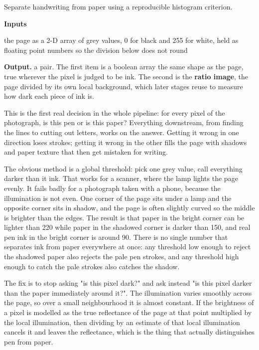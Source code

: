 Separate handwriting from paper using a reproducible histogram criterion.




\noindent\textbf{Inputs}
\begin{description}[leftmargin=2.2em,style=nextline,font=\normalfont\ttfamily]\setlength\itemsep{1pt}
  \item[{gray}] \normalfont the page as a 2-D array of grey values, 0 for black and 255 for white, held as floating point numbers so the division below does not round
\end{description}

\noindent\textbf{Output.} a pair. The first item is a boolean array the same shape as the page, true wherever the pixel is judged to be ink. The second is the \textbf{ratio image}, the page divided by its own local background, which later stages reuse to measure how dark each piece of ink is.


This is the first real decision in the whole pipeline: for every pixel of the photograph, is this pen or is this paper? Everything downstream, from finding the lines to cutting out letters, works on the answer. Getting it wrong in one direction loses strokes; getting it wrong in the other fills the page with shadows and paper texture that then get mistaken for writing.


The obvious method is a global threshold: pick one grey value, call everything darker than it ink. That works for a scanner, where the lamp lights the page evenly. It fails badly for a photograph taken with a phone, because the illumination is not even. One corner of the page sits under a lamp and the opposite corner sits in shadow, and the page is often slightly curved so the middle is brighter than the edges. The result is that paper in the bright corner can be lighter than 220 while paper in the shadowed corner is darker than 150, and real pen ink in the bright corner is around 90. There is no single number that separates ink from paper everywhere at once: any threshold low enough to reject the shadowed paper also rejects the pale pen strokes, and any threshold high enough to catch the pale strokes also catches the shadow.


The fix is to stop asking "is this pixel dark?" and ask instead "is this pixel darker than the paper immediately around it?". The illumination varies smoothly across the page, so over a small neighbourhood it is almost constant. If the brightness of a pixel is modelled as the true reflectance of the page at that point multiplied by the local illumination, then dividing by an estimate of that local illumination cancels it and leaves the reflectance, which is the thing that actually distinguishes pen from paper.


